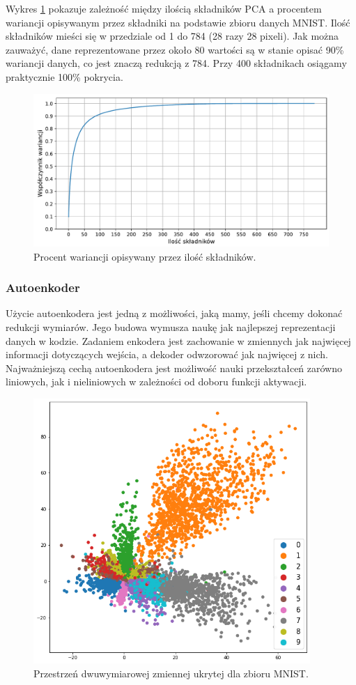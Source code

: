 \documentclass[a4paper,12pt,oneside]{book} %
\begin{document}
Wykres \ref{fig:pcacumsum} pokazuje zależność między ilością składników PCA a procentem wariancji opisywanym przez składniki na podstawie zbioru danych MNIST. Ilość składników mieści się w przedziale od 1 do 784 (28 razy 28 pixeli). Jak można zauważyć, dane reprezentowane przez około 80 wartości są w stanie opisać 90\% wariancji danych, co jest znaczą redukcją z 784. Przy 400 składnikach osiągamy praktycznie 100\% pokrycia. 
\begin{figure}[h!]
	\centering
	\includegraphics[width=\textwidth]{pcacumsum.pdf}
	\caption{Procent wariancji opisywany przez ilość składników.}
	\label{fig:pcacumsum}
\end{figure}
\subsubsection{Autoenkoder}
Użycie autoenkodera jest jedną z możliwości, jaką mamy, jeśli chcemy dokonać redukcji wymiarów. Jego budowa wymusza naukę jak najlepszej reprezentacji danych w kodzie. Zadaniem enkodera jest zachowanie w zmiennych jak najwięcej informacji dotyczących wejścia, a dekoder odwzorować jak najwięcej z nich. Najważniejszą cechą autoenkodera jest możliwość nauki przekształceń zarówno liniowych, jak i nieliniowych w zależności od doboru funkcji aktywacji.
\begin{figure}[h!]
	\centering
	\includegraphics[width=10.5cm]{pictures/aelatentspace.png}
	\caption{Przestrzeń dwuwymiarowej zmiennej ukrytej dla zbioru MNIST.}
	\label{fig:latentspaceae}
\end{figure}
\end{document}
